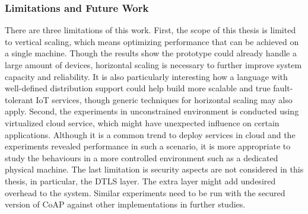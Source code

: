 \subsubsection{Limitations and Future Work}

There are three limitations of this work. First, the scope of this thesis is limited to vertical scaling, which means optimizing performance that can be achieved on a single machine. Though the results show the prototype could already handle a large amount of devices, horizontal scaling is necessary to further improve system capacity and reliability. It is also particularly interesting how a language with well-defined distribution support could help build more scalable and true fault-tolerant IoT services, though generic techniques for horizontal scaling may also apply. Second, the experiments in unconstrained environment is conducted using virtualized cloud service, which might have unexpected influence on certain applications. Although it is a common trend to deploy services in cloud and the experiments revealed performance in such a scenario, it is more appropriate to study the behaviours in a more controlled environment such as a dedicated physical machine. The last limitation is security aspects are not considered in this thesis, in particular, the DTLS layer. The extra layer might add undesired overhead to the system. Similar experiments need to be run with the secured version of CoAP against other implementations in further studies.








